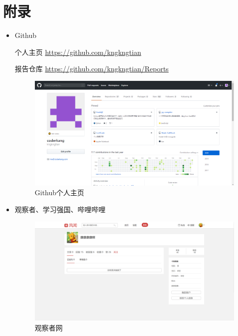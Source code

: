 \documentclass{article}
\begin{document}
\section{附录}
\begin{itemize}
    \item Github\par
    个人主页
    \url{https://github.com/kngkngtian}\par
    报告仓库
    \url{https://github.com/kngkngtian/Reports}
    \begin{figure}[ht]
        \centering
        \includegraphics[scale=0.1]{github.png}
        \caption{Github个人主页}
        \label{fig:label}
        \end{figure}
    \newpage
    \item 观察者、学习强国、哔哩哔哩
    \begin{figure}[ht]
        \centering
        \includegraphics[scale=0.1]{gcz.png}
        \caption{观察者网}
        \label{fig:label}
        \end{figure}
    \begin{figure}[ht]
        \centering

\end{figure}
\end{itemize}
\end{document}
